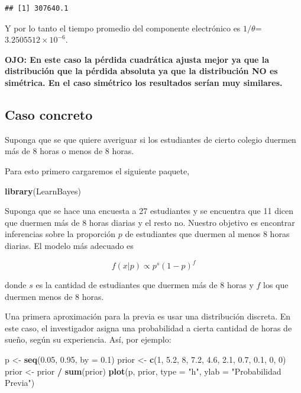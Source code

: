\documentclass[
  12pt,
]{book}
\newenvironment{Shaded}{\begin{snugshade}}{\end{snugshade}}
\newcommand{\DataTypeTok}[1]{\textcolor[rgb]{0.13,0.29,0.53}{#1}}
\newcommand{\DecValTok}[1]{\textcolor[rgb]{0.00,0.00,0.81}{#1}}
\newcommand{\FloatTok}[1]{\textcolor[rgb]{0.00,0.00,0.81}{#1}}
\newcommand{\KeywordTok}[1]{\textcolor[rgb]{0.13,0.29,0.53}{\textbf{#1}}}
\newcommand{\NormalTok}[1]{#1}
\newcommand{\OperatorTok}[1]{\textcolor[rgb]{0.81,0.36,0.00}{\textbf{#1}}}
\newcommand{\StringTok}[1]{\textcolor[rgb]{0.31,0.60,0.02}{#1}}
\begin{document}
\begin{verbatim}
## [1] 307640.1
\end{verbatim}

Y por lo tanto el tiempo promedio del componente electrónico es \(1/\theta\)=\ensuremath{3.2505512\times 10^{-6}}.

\textbf{OJO: En este caso la pérdida cuadrática ajusta mejor ya que la distribución que la pérdida absoluta ya que la distribución NO es simétrica. En el caso simétrico los resultados serían muy similares.}

\hypertarget{caso-concreto}{%
\subsection{Caso concreto}\label{caso-concreto}}

Suponga que se que quiere averiguar si los estudiantes de cierto colegio duermen más de 8 horas o menos de 8 horas.

Para esto primero cargaremos el siguiente paquete,

\begin{Shaded}
\begin{Highlighting}[]
\KeywordTok{library}\NormalTok{(LearnBayes)}
\end{Highlighting}
\end{Shaded}

Suponga que se hace una encuesta a 27 estudiantes y se encuentra que 11 dicen que duermen más de 8 horas diarias y el resto no. Nuestro objetivo es encontrar inferencias sobre la proporción \(p\) de estudiantes que duermen al menos 8 horas diarias. El modelo más adecuado es

\[
f(x \vert p) \propto p^s (1-p)^f
\]

donde \(s\) es la cantidad de estudiantes que duermen más de 8 horas y \(f\) los que duermen menos de 8 horas.

Una primera aproximación para la previa es usar una distribución discreta. En este caso, el investigador asigna una probabilidad a cierta cantidad de horas de sueño, según su experiencia. Así, por ejemplo:

\begin{Shaded}
\begin{Highlighting}[]
\NormalTok{p \textless{}{-}}\StringTok{ }\KeywordTok{seq}\NormalTok{(}\FloatTok{0.05}\NormalTok{, }\FloatTok{0.95}\NormalTok{, }\DataTypeTok{by =} \FloatTok{0.1}\NormalTok{)}
\NormalTok{prior \textless{}{-}}\StringTok{ }\KeywordTok{c}\NormalTok{(}\DecValTok{1}\NormalTok{, }\FloatTok{5.2}\NormalTok{, }\DecValTok{8}\NormalTok{, }\FloatTok{7.2}\NormalTok{, }\FloatTok{4.6}\NormalTok{, }\FloatTok{2.1}\NormalTok{, }\FloatTok{0.7}\NormalTok{, }\FloatTok{0.1}\NormalTok{, }\DecValTok{0}\NormalTok{, }\DecValTok{0}\NormalTok{)}
\NormalTok{prior \textless{}{-}}\StringTok{ }\NormalTok{prior }\OperatorTok{/}\StringTok{ }\KeywordTok{sum}\NormalTok{(prior)}
\KeywordTok{plot}\NormalTok{(p, prior, }\DataTypeTok{type =} \StringTok{"h"}\NormalTok{, }\DataTypeTok{ylab =} \StringTok{"Probabilidad Previa"}\NormalTok{)}
\end{Highlighting}
\end{Shaded}
\end{document}
